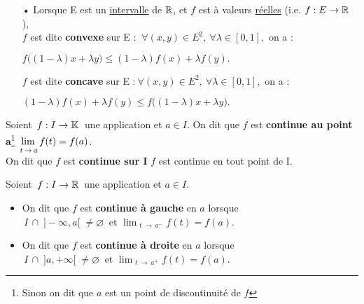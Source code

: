 \begin{itemize}
    
    \item[•] Lorsque E est un \underline{intervalle} de $\mathbb{R}$, et \(f\) est à valeurs \underline{réelles} (i.e. \(f : E\to \mathbb{R}\ \)),\vspace{0.1cm} \\
    \(f\) est dite \textbf{convexe} sur E \ssi : \( \ \forall (x,y) \in E^2,\ \forall \lambda \in [0,1],\) on a : \vspace{-0.3cm} 
    \begin{center}\(f\bigl((1-\lambda)x+\lambda y\bigr) \leq (1-\lambda)f(x) + \lambda f(y).\) \end{center} 
    \(f\) est dite \textbf{concave} sur E \ssi :\( \ \forall (x,y) \in E^2,\ \forall \lambda \in [0,1],\) on a : \vspace{-0.3cm} 
    \begin{center}\((1-\lambda)f(x) + \lambda f(y) \leq f\bigl((1-\lambda)x+\lambda y\bigr).\) \end{center}
\end{itemize}

\vspace{1cm}

Soient \(\,f:I\to\mathbb{K}\,\) une application et \(a\in I\). On dit que $f$ est \textbf{continue au point a}\footnote{Sinon on dit que $a$ est un point de discontinuité de $f$} \ssi \(\,\displaystyle \adjustlimits\lim_{t\,\to\,a} f(t)=f(a)\).\vspace{0.2cm}\\
On dit que $f$ est \textbf{continue sur I} \ssi $f$ est continue en tout point de I.

\vspace{1cm}

\noindent Soient \(\,f:I\to \mathbb{R}\,\) une application et \(a\in I\).
\begin{itemize}[leftmargin=1cm, label=•]
	\item On dit que $f$ est \textbf{continue à gauche} en $a$ lorsque \(\displaystyle \,I\,\cap\;]-\infty,a[\;\neq \varnothing \ \text{ et } \lim_{\ \,t\,\to\, a^-}f(t)=f(a)\).
	
	\item On dit que $f$ est \textbf{continue à droite} en $a$ lorsque \(\displaystyle \,I\,\cap\;]a,+\infty[\;\neq \varnothing \ \text{ et } \lim_{\ \,t\,\to\, a^+}f(t)=f(a)\). 

\end{itemize}

